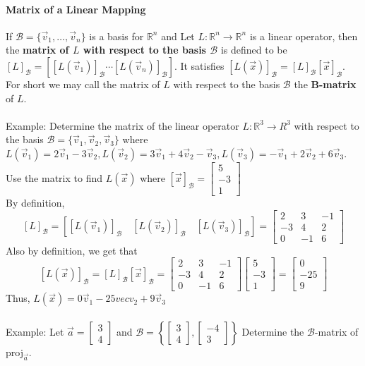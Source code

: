 \documentclass[10pt,letter]{article}
\begin{document}
\paragraph{Matrix of a Linear Mapping} If $\mathcal{B}=\{\vec{v}_1,\ldots,\vec{v}_n\}$ is a basis for $\mathbb{R}^n$ and Let $L:\mathbb{R}^n\rightarrow\mathbb{R}^n$ is a linear operator, then the \textbf{matrix of $L$ with respect to the basis $\mathcal{B}$} is defined to be $[L]_\mathcal{B}=\left[[L(\vec{v}_1)]_\mathcal{B}\cdots[L(\vec{v}_n)]_\mathcal{B}\right]$. It satisfies $[L(\vec{x})]_\mathcal{B}=[L]_\mathcal{B}[\vec{x}]_\mathcal{B}$. For short we may call the matrix of $L$ with respect to the basis $\mathcal{B}$ the \textbf{B-matrix} of $L$. \\ \\
Example: Determine the matrix of the linear operator $L:\mathbb{R}^3\rightarrow R^3$ with respect to the basis $\mathcal{B}=\{\vec{v}_1,\vec{v}_2,\vec{v}_3\}$ where $L(\vec{v}_1)=2\vec{v}_1-3\vec{v}_2,L(\vec{v}_2)=3\vec{v}_1+4\vec{v}_2-\vec{v}_3, L(\vec{v}_3)=-\vec{v}_1+2\vec{v}_2+6\vec{v}_3$. Use the matrix to find $L(\vec{x})$ where $[\vec{x}]_\mathcal{B}=\begin{bmatrix}5\\-3\\1\end{bmatrix}$ \\ 
By definition, $$[L]_\mathcal{B}=\left[[L(\vec{v}_1)]_\mathcal{B}\quad[L(\vec{v}_2)]_\mathcal{B}\quad[L(\vec{v}_3)]_\mathcal{B}\right]=\begin{bmatrix}2&3&-1\\-3&4&2\\0&-1&6\end{bmatrix}$$ Also by definition, we get that $$[L(\vec{x})]_\mathcal{B}=[L]_\mathcal{B}[\vec{x}]_\mathcal{B}=\begin{bmatrix}2&3&-1\\-3&4&2\\0&-1&6\end{bmatrix}\begin{bmatrix}5\\-3\\1\end{bmatrix}=\begin{bmatrix}0\\-25\\9\end{bmatrix}$$ Thus, $L(\vec{x})=0\vec{v}_1-25vec{v}_2+9\vec{v}_3$\\ \\
Example: Let $\vec{a}=\begin{bmatrix}3\\4\end{bmatrix}$ and $\mathcal{B}=\left\{\begin{bmatrix}3\\4\end{bmatrix},\begin{bmatrix}-4\\3\end{bmatrix}\right\}$ Determine the $\mathcal{B}$-matrix of proj$_{\vec{a}}$.  \\ 
\end{document}
